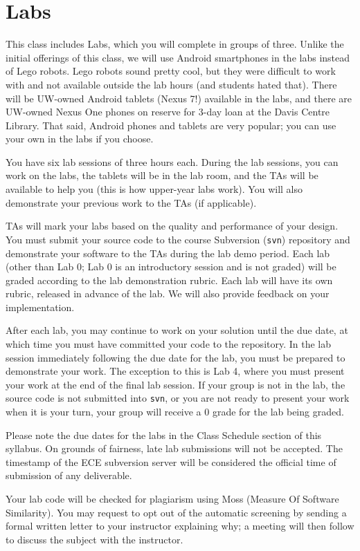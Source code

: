 \documentclass[letterpaper,10pt]{article}
\begin{document}
\section*{Labs}
This class includes Labs, which you will complete in groups of three. Unlike the initial offerings of this class, we will use Android smartphones in the labs instead of Lego robots. Lego robots sound pretty cool, but they were difficult to work with and not available outside the lab hours (and students hated that). There will be UW-owned Android tablets (Nexus 7!) available in the labs, and there are UW-owned Nexus One phones on reserve for 3-day loan at the Davis Centre Library. That said, Android phones and tablets are very popular; you can use your own in the labs if you choose.

You have six lab sessions of three hours each. During the lab sessions, you can work on the labs, the tablets will be in the lab room, and the TAs will be available to help you (this is how upper-year labs work). You will also demonstrate your previous work to the TAs (if applicable).

TAs will mark your labs based on the quality and performance of your design. You must submit your source code to the course Subversion (\texttt{svn}) repository and demonstrate your software to the TAs during the lab demo period. Each lab (other than Lab 0; Lab 0 is an introductory session and is not graded) will be graded according to the lab demonstration rubric. Each lab will have its own rubric, released in advance of the lab. We will also provide feedback on your implementation.

After each lab, you may continue to work on your solution until the due date, at which time you must have committed your code to the repository. In the lab session immediately following the due date for the lab, you must be prepared to demonstrate your work. The exception to this is Lab 4, where you must present your work at the end of the final lab session.  If your group is not in the lab, the source code is not submitted into \texttt{svn}, or you are not ready to present your work when it is your turn, your group will receive a 0 grade for the lab being graded.

Please note the due dates for the labs in the Class Schedule section of this syllabus. On grounds of fairness, late lab submissions will not be accepted. The timestamp of the ECE subversion server will be considered the official time of submission of any deliverable.

Your lab code will be checked for plagiarism using Moss (Measure Of Software Similarity). You may request to opt out of the automatic screening by sending a formal written letter to your instructor explaining why; a meeting will then follow to discuss the subject with the instructor.
\end{document}
